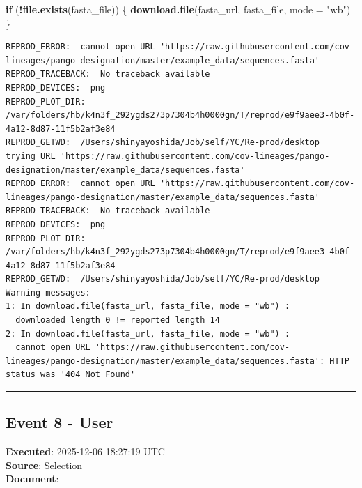 \documentclass[
  11pt,
]{article}
\newenvironment{Shaded}{\begin{snugshade}}{\end{snugshade}}
\newcommand{\AttributeTok}[1]{\textcolor[rgb]{0.13,0.29,0.53}{#1}}
\newcommand{\ControlFlowTok}[1]{\textcolor[rgb]{0.13,0.29,0.53}{\textbf{#1}}}
\newcommand{\FunctionTok}[1]{\textcolor[rgb]{0.13,0.29,0.53}{\textbf{#1}}}
\newcommand{\NormalTok}[1]{#1}
\newcommand{\SpecialCharTok}[1]{\textcolor[rgb]{0.81,0.36,0.00}{\textbf{#1}}}
\newcommand{\StringTok}[1]{\textcolor[rgb]{0.31,0.60,0.02}{#1}}
\newenvironment{rpoutput}{\vspace{0.5em}\begin{snugshade}}{\end{snugshade}}
\begin{document}
\begin{Shaded}
\begin{Highlighting}[]
\ControlFlowTok{if}\NormalTok{ (}\SpecialCharTok{!}\FunctionTok{file.exists}\NormalTok{(fasta\_file)) \{}
  \FunctionTok{download.file}\NormalTok{(fasta\_url, fasta\_file, }\AttributeTok{mode =} \StringTok{"wb"}\NormalTok{)}
\NormalTok{\}}
\end{Highlighting}
\end{Shaded}

\begin{rpoutput}

\begin{verbatim}
REPROD_ERROR:  cannot open URL 'https://raw.githubusercontent.com/cov-lineages/pango-designation/master/example_data/sequences.fasta' 
REPROD_TRACEBACK:  No traceback available  
REPROD_DEVICES:  png 
REPROD_PLOT_DIR:  /var/folders/hb/k4n3f_292ygds273p7304b4h0000gn/T/reprod/e9f9aee3-4b0f-4a12-8d87-11f5b2af3e84 
REPROD_GETWD:  /Users/shinyayoshida/Job/self/YC/Re-prod/desktop 
trying URL 'https://raw.githubusercontent.com/cov-lineages/pango-designation/master/example_data/sequences.fasta'
REPROD_ERROR:  cannot open URL 'https://raw.githubusercontent.com/cov-lineages/pango-designation/master/example_data/sequences.fasta' 
REPROD_TRACEBACK:  No traceback available  
REPROD_DEVICES:  png 
REPROD_PLOT_DIR:  /var/folders/hb/k4n3f_292ygds273p7304b4h0000gn/T/reprod/e9f9aee3-4b0f-4a12-8d87-11f5b2af3e84 
REPROD_GETWD:  /Users/shinyayoshida/Job/self/YC/Re-prod/desktop 
Warning messages:
1: In download.file(fasta_url, fasta_file, mode = "wb") :
  downloaded length 0 != reported length 14
2: In download.file(fasta_url, fasta_file, mode = "wb") :
  cannot open URL 'https://raw.githubusercontent.com/cov-lineages/pango-designation/master/example_data/sequences.fasta': HTTP status was '404 Not Found'
\end{verbatim}

\end{rpoutput}

\begin{center}\rule{0.5\linewidth}{0.5pt}\end{center}

\subsection{Event 8 - User}\label{event-8---user}

\textbf{Executed}: 2025-12-06 18:27:19 UTC\\
\textbf{Source}: Selection\\
\textbf{Document}:
\end{document}
